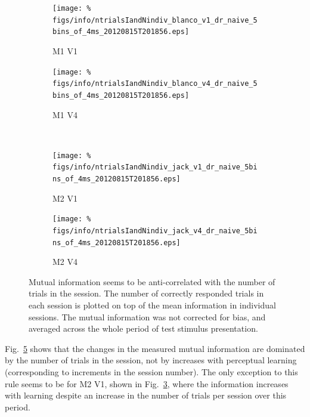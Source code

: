 \begin{figure}[htbp]
    \begin{subfigure}[b]{0.5\linewidth}
        \centering
        \caption{\ac{M1} \ac{V1}}
        \label{fig:IandNb1}
        \texttt{[image: \%
figs/info/ntrialsIandNindiv\_blanco\_v1\_dr\_naive\_5bins\_of\_4ms\_20120815T201856.eps]}
    \end{subfigure}
    \begin{subfigure}[b]{0.5\linewidth}
        \centering
        \caption{\ac{M1} \ac{V4}}
        \label{fig:IandNb4}
        \texttt{[image: \%
figs/info/ntrialsIandNindiv\_blanco\_v4\_dr\_naive\_5bins\_of\_4ms\_20120815T201856.eps]}
    \end{subfigure}
    \\
    \begin{subfigure}[b]{0.5\linewidth}
        \centering
        \caption{\ac{M2} \ac{V1}}
        \label{fig:IandNj1}
        \texttt{[image: \%
figs/info/ntrialsIandNindiv\_jack\_v1\_dr\_naive\_5bins\_of\_4ms\_20120815T201856.eps]}
    \end{subfigure}
    \begin{subfigure}[b]{0.5\linewidth}
        \centering
        \caption{\ac{M2} \ac{V4}}
        \label{fig:IandNj4}
        \texttt{[image: \%
figs/info/ntrialsIandNindiv\_jack\_v4\_dr\_naive\_5bins\_of\_4ms\_20120815T201856.eps]}
    \end{subfigure}
    \caption{Mutual information seems to be anti-correlated with the number of trials in the session. The number of correctly responded trials in each session is plotted on top of the mean information in individual sessions. The mutual information was not corrected for bias, and averaged across the whole period of test stimulus presentation.
}
    \label{fig:IandN}
\end{figure}

Fig.~\ref{fig:IandN} shows that the changes in the measured mutual information are dominated by the number of trials in the session, not by increases with perceptual learning (corresponding to increments in the session number).
The only exception to this rule seems to be for \ac{M2} \ac{V1}, shown in Fig.~\ref{fig:IandNj1}, where the information increases with learning despite an increase in the number of trials per session over this period.

